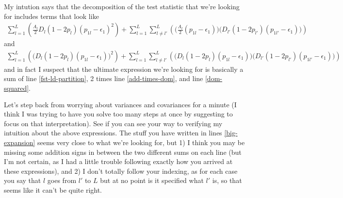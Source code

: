 \documentclass[a4paper,10pt]{article}
\begin{document}
    My intution says that the decomposition of the test statistic that we're looking for includes terms that look like 
    \begin{align}
      \sum^L_{l=1}\left(\frac{A_l}{2}D_l(1-2p_l)(p_{1l}-\epsilon_{1})^2\right) + \sum^L_{l=1}\sum^L_{l\neq l'}\left(\Bigg(\frac{A_l}{2}(p_{1l}-\epsilon_{1})\Bigg)\Bigg(D_{l'}\left(1-2p_{l'}\right)\left(p_{1l'}-\epsilon_{1}\right)\Bigg)\right) \label{add-times-dom}
    \end{align}
    and
    \begin{align}
      \sum^L_{l=1}\left(\Big(D_l(1-2p_l)(p_{1l}-\epsilon_{1})\Big)^2\right) + \sum^L_{l=1}\sum^L_{l\neq l'}\left(\Bigg(D_{l}\left(1-2p_{l}\right)\left(p_{1l}-\epsilon_{1}\right)\Bigg)\Bigg(D_{l'}\left(1-2p_{l'}\right)\left(p_{1l'}-\epsilon_{1}\right)\Bigg)\right) \label{dom-squared}
    \end{align}
    and in fact I suspect that the ultimate expression we're looking for is basically a sum of line \eqref{fst-ld-partition}, 2 times line \eqref{add-times-dom}, and line \eqref{dom-squared}.

    Let's step back from worrying about variances and covariances for a minute (I think I was trying to have you solve too many steps at once by suggesting to focus on that interpretation). See if you can see your way to verifying my intuition about the above expressions. The stuff you have written in lines \eqref{big-expansion} seems very close to what we're looking for, but 1) I think you may be missing some addition signs in between the two different sums on each line (but I'm not certain, as I had a little trouble following exactly how you arrived at these expressions), and 2) I don't totally follow your indexing, as for each case you say that $l$ goes from $l'$ to $L$ but at no point is it specified what $l'$ is, so that seems like it can't be quite right.


\end{document}
